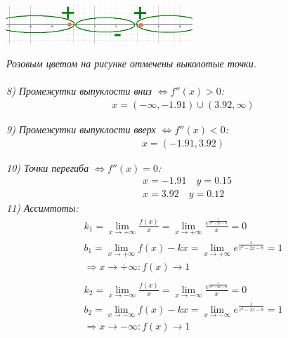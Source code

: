 \documentclass[a4paper,11pt]{article}
\begin{document}
\begin{center}
	\includegraphics[width = 70mm]{images/743.png}
\end{center}
\noindent \textit{Розовым цветом на рисунке отмечены выколотые точки.} \\ \\
\noindent \textsl{8) Промежутки  выпуклости вниз $\Longleftrightarrow f''(x) > 0 $:}
\begin{gather*}
x = (-\infty, -1.91) \cup (3.92, \infty)
\end{gather*}

\noindent \textsl{9) Промежутки  выпуклости вверх $\Longleftrightarrow f''(x) < 0 $:}
\begin{gather*}
x = (-1.91, 3.92)
\end{gather*}

\noindent \textsl{10) Точки перегиба   $\Longleftrightarrow f''(x) = 0 $:}
\begin{align*}
&x = -1.91 \quad y = 0.15\\
&x = 3.92  \quad y = 0.12
\end{align*}
\noindent \textsl{11) Ассимтоты:}
\begin{gather*}
k_1 = \lim_{x \to +\infty} \frac{f(x)}{x} = \lim_{x \to +\infty} \frac{e^{\frac{1}{x^2 - 2x - 8}}}{x} = 0 \\
b_1 = \lim_{x \to +\infty} f(x) - kx = \lim_{x \to +\infty} e^{\frac{1}{x^2 - 2x - 8}} = 1 \\ 
\Rightarrow x \to +\infty: f(x) \to 1 \\ \\
k_2 = \lim_{x \to -\infty} \frac{f(x)}{x} = \lim_{x \to -\infty} \frac{e^{\frac{1}{x^2 - 2x - 8}}}{x} = 0 \\
b_2 = \lim_{x \to -\infty} f(x) - kx = \lim_{x \to -\infty} e^{\frac{1}{x^2 - 2x - 8}} = 1 \\ 
\Rightarrow x \to -\infty: f(x) \to 1 \\ \\
\end{gather*}
\newpage




\end{document}
